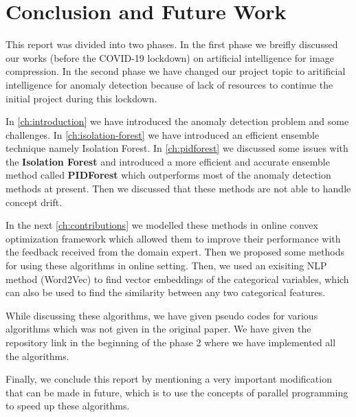 \chapter{Conclusion and Future Work}
\label{ch:conclusion-future-work}

This report was divided into two phases. In the first phase we breifly discussed our works (before the COVID-19 lockdown) on artificial intelligence for image compression.
In the second phase we have changed our project topic to aritificial intelligence for anomaly detection because of lack of resources to continue the initial project during this lockdown. 

In \cref{ch:introduction} we have introduced the anomaly detection problem and some challenges. In \cref{ch:isolation-forest} we have introduced an efficient ensemble technique namely Isolation Forest. In \cref{ch:pidforest} we discussed some issues with the \textbf{Isolation Forest} and introduced a more efficient and accurate ensemble method called \textbf{PIDForest} which outperforms most of the anomaly detection methods at present. Then we discussed that these methods are not able to handle concept drift. 

In the next \cref{ch:contributions} we modelled these methods in online convex optimization framework which allowed them to improve their performance with the feedback received from the domain expert. Then we proposed some methods for using these algorithms in online setting. Then, we used an exisiting NLP method (Word2Vec) to find vector embeddings of the categorical variables, which can also be used to find the similarity between any two categorical features. 

While discussing these algorithms, we have given pseudo codes for various algorithms which was not given in the original paper. We have given the repository link in the beginning of the phase 2 where we have implemented all the algorithms. 

Finally, we conclude this report by mentioning a very important modification that can be made in future, which is to use the concepts of parallel programming to speed up these algorithms.
